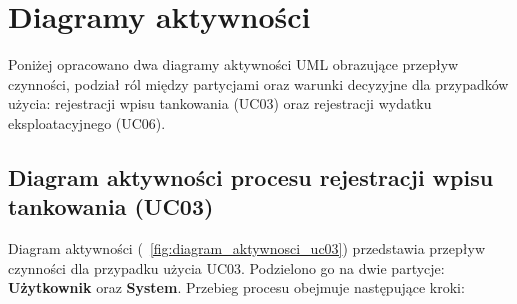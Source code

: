 
\section{Diagramy aktywności}
\label{sec:diagramy_aktywnosci}

Poniżej opracowano dwa diagramy aktywności UML obrazujące przepływ czynności, podział ról między partycjami oraz warunki decyzyjne dla przypadków użycia: rejestracji wpisu tankowania (UC03) oraz rejestracji wydatku eksploatacyjnego (UC06).


\subsection{Diagram aktywności procesu rejestracji wpisu tankowania (UC03)}
\label{subsec:diagram_aktywnosci_uc03}

Diagram aktywności (\figurename~\ref{fig:diagram_aktywnosci_uc03}) przedstawia przepływ czynności dla przypadku użycia UC03. Podzielono go na dwie partycje: \textbf{Użytkownik} oraz \textbf{System}. Przebieg procesu obejmuje następujące kroki:

